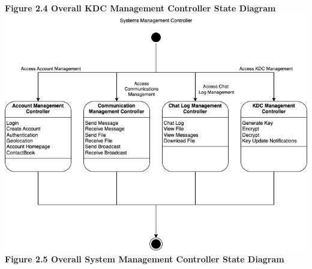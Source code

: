 \documentclass[]{article}
\begin{document}
\begin{center}
	\textbf{Figure 2.4 Overall KDC Management Controller State Diagram}
	\includegraphics[width=\textwidth]{../images/ControllerStateDiagrams/SystemController.png}
	\textbf{Figure 2.5 Overall System Management Controller State Diagram}
\end{center}
\end{document}
